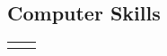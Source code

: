 \documentclass[10pt]{article} %
\begin{document}
\begin{paracol}{2}
%
%
%
%
%
%	
%	
%	
%	
%	
%	


\section{Computer Skills} 





\begin{supertabular}{rl} %
	
	
	
	

\end{supertabular}
\end{paracol}
\end{document}
